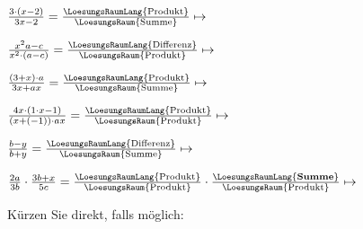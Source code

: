 \begin{bbwAufgabenBlock}




\item  $\frac{3\cdot{}(x-2)}{3x-2}
= \frac{\LoesungsRaumLang{\textrm{Produkt}}}{\LoesungsRaum{\textrm{Summe}}} \mapsto
$ 

\item  $\frac{x^2a-c}{x^2\cdot{}(a-c)} = \frac{\LoesungsRaumLang{\textrm{Differenz}}}{\LoesungsRaum{\textrm{Produkt}}} \mapsto $ 

\item  $\frac{(3+x)\cdot{}a}{3x+ax} = \frac{\LoesungsRaumLang{\textrm{Produkt}}}{\LoesungsRaum{\textrm{Summe}}} \mapsto $ 

\item $\frac{4x\cdot{}(1\cdot{}x-1)}{(x+(-1))\cdot{}ax} = \frac{\LoesungsRaumLang{\textrm{Produkt}}}{\LoesungsRaum{\textrm{Produkt}}} \mapsto $ 

\item  $\frac{b-y}{b+y} = \frac{\LoesungsRaumLang{\textrm{Differenz}}}{\LoesungsRaum{\textrm{Summe}}} \mapsto $ 

\item  $\frac{2a}{3b}\cdot{}\frac{3b+x}{5c}
= \frac{\LoesungsRaumLang{\textrm{Produkt}}}{\LoesungsRaum{\textrm{Produkt}}} \cdot{} \frac{\LoesungsRaumLang{\textrm{\textbf{Summe}}}}{\LoesungsRaum{\textrm{Produkt}}}  \mapsto $ 

\end{bbwAufgabenBlock}


Kürzen Sie direkt, falls möglich:

